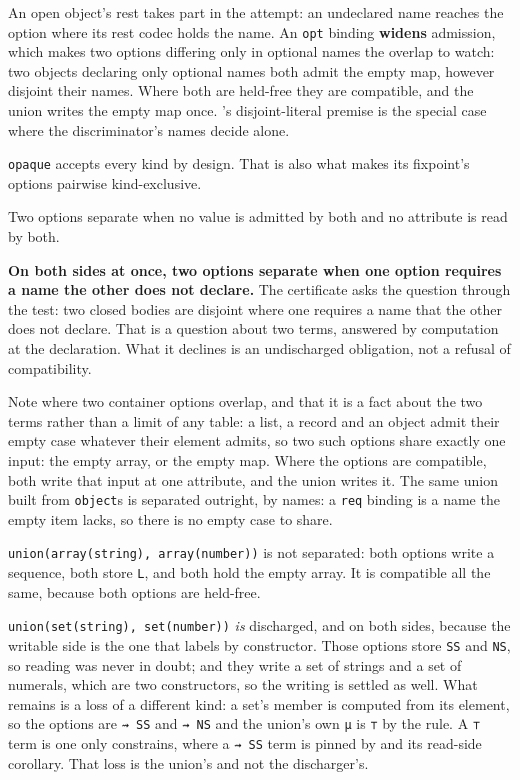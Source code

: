 An open object's rest takes part in the attempt: an undeclared name reaches the option where its rest
codec holds the name. An \texttt{opt} binding \textbf{widens} admission, which makes two options differing only
in optional names the overlap to watch: two objects declaring only optional names both admit the
empty map, however disjoint their names. Where both are held-free they are compatible, and the
union writes the empty map once. 's disjoint-literal premise is the
special case where the discriminator's names decide alone.

\texttt{opaque} accepts every kind by design. That is also what makes its fixpoint's options
pairwise kind-exclusive.

\begin{definition}[separation]
\label{def:family}
\leanok
Two options separate when no value is admitted by both and no attribute is read by both.
\end{definition}

\textbf{On both sides at once, two options separate when one option requires a name the other does
not declare.} The certificate asks the question through
the test: two closed bodies are disjoint where one requires a name that the other does not
declare. That is a question about two terms, answered by computation at the declaration. What it declines is an undischarged obligation, not a refusal of
compatibility.

Note where two container options overlap, and that it is a fact about the two terms rather than a
limit of any table: a list, a record and an object admit their empty case whatever their element
admits, so two such options share exactly one input: the empty array, or the empty map. Where the options are compatible,
both write that input at one attribute, and the union writes it. The same union built from
\texttt{object}s is separated outright, by names: a \texttt{req} binding is a name the empty item lacks, so
there is no empty case to share.

\texttt{union(array(string),\ array(number))} is not separated: both options write a sequence, both store
\texttt{L}, and both hold the empty array. It is compatible all the same, because both options are
held-free.

\texttt{union(set(string),\ set(number))} \emph{is} discharged, and on both sides, because
the writable side is the one that labels by constructor. Those options store \texttt{SS} and \texttt{NS}, so
reading was never in doubt; and they write a set of strings and a set of numerals, which are two
constructors, so the writing is settled as well. What remains is a loss of a different kind: a set's
member is computed from its element, so the options are \texttt{⇝\ SS} and \texttt{⇝\ NS} and the union's own \texttt{μ} is
\texttt{⊤} by the  rule. A \texttt{⊤} term is one only  constrains, where a \texttt{⇝\ SS} term is pinned
by  and its read-side corollary. That loss is the union's and not the discharger's.

